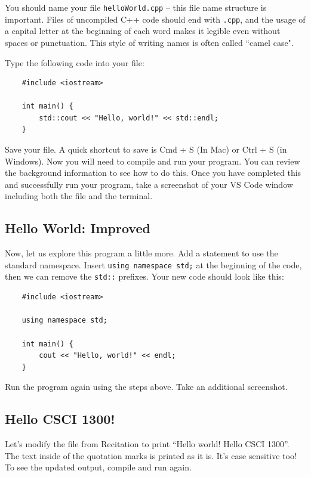 You should name your file \texttt{helloWorld.cpp} -- this file name structure is important. Files of uncompiled C++ code should end with \texttt{.cpp}, and the usage of a capital letter at the beginning of each word makes it legible even without spaces or punctuation. This style of writing names is often called ``camel case". 

Type the following code into your file:

\begin{verbatim}
    #include <iostream>

    int main() {
        std::cout << "Hello, world!" << std::endl;
    }
\end{verbatim}

Save your file.  A quick shortcut to save is Cmd + S (In Mac) or Ctrl + S (in Windows). Now you will need to compile and run your program. You can review the background information to see how to do this. Once you have completed this and successfully run your program, take a screenshot of your VS Code window including both the file and the terminal. 

\subsection{Hello World: Improved}

Now, let us explore this program a little more. Add a statement to use the standard namespace. Insert \texttt{using namespace std;} at the beginning of the code, then we can remove the \texttt{std::} prefixes. Your new code should look like this:

\begin{verbatim}
    #include <iostream>

    using namespace std;
    
    int main() {
        cout << "Hello, world!" << endl;
    }
\end{verbatim}

Run the program again using the steps above. Take an additional screenshot.

\subsection{Hello CSCI 1300!}

Let’s modify the file from Recitation to print ``Hello world! Hello CSCI 1300”. The text inside of the quotation marks is printed as it is. It’s case sensitive too! To see the updated output, compile and run again.

